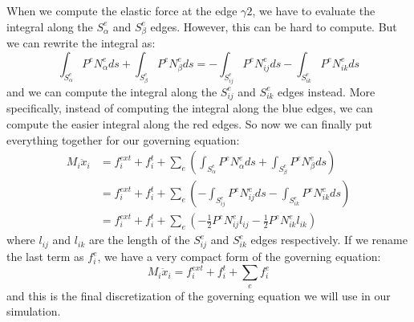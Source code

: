 \documentclass[acmtog]{acmart}
\begin{document}
When we compute the elastic force at the edge $\gamma2$, we have to evaluate the integral along the $S_{\alpha}^e$ and $S_{\beta}^e$ edges. However, this can be hard to compute. But we can rewrite the integral as:
\begin{equation*}
  \int_{S_{\alpha}^e} P^e N_{\alpha}^e ds + \int_{S_{\beta}^e} P^e N_{\beta}^e ds = - \int_{S_{ij}^e} P^e N_{ij}^e ds - \int_{S_{ik}^e} P^e N_{ik}^e ds
\end{equation*}
and we can compute the integral along the $S_{ij}^e$ and $S_{ik}^e$ edges instead. More specifically, instead of computing the integral along the blue edges, we can compute the easier integral along the red edges. So now we can finally put everything together for our governing equation:
\begin{align*}
  M_i \ddot{x}_i &= f^{ext}_i + f^{t}_i + \sum_e \left ( \int_{S_{\alpha}^e} P^e N_{\alpha}^e ds + \int_{S_{\beta}^e} P^e N_{\beta}^e ds \right ) \\
  &= f^{ext}_i + f^{t}_i + \sum_e \left ( -\int_{S_{ij}^e} P^e N_{ij}^e ds - \int_{S_{ik}^e} P^e N_{ik}^e ds \right ) \\
  &= f^{ext}_i + f^{t}_i + \sum_e \left ( -\frac{1}{2}P^e N_{ij}^e l_{ij} - \frac{1}{2}P^e N_{ik}^e l_{ik} \right )
\end{align*}
where $l_{ij}$ and $l_{ik}$ are the length of the $S_{ij}^e$ and $S_{ik}^e$ edges respectively. If we rename the last term as $f^e_i$, we have a very compact form of the governing equation:
\begin{equation*}
  M_i \ddot{x}_i = f^{ext}_i + f^{t}_i + \sum_e f^e_i
\end{equation*}
and this is the final discretization of the governing equation we will use in our simulation.
\end{document}
